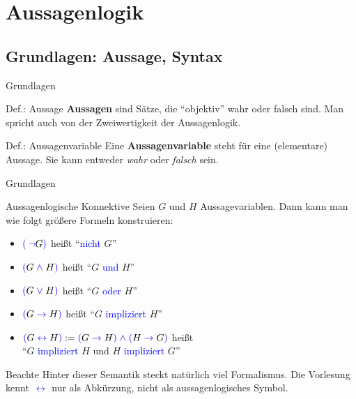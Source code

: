 \section{Aussagenlogik}
\subsection{Grundlagen: Aussage, Syntax}

\begin{frame}{Grundlagen}
	\begin{block}{Def.: Aussage}
		\textbf{Aussagen} sind Sätze, die "`objektiv"' wahr oder falsch sind. Man spricht auch von der Zweiwertigkeit der Aussagenlogik.
	\end{block}
	\pause
	\begin{block}{Def.: Aussagenvariable}
		Eine \textbf{Aussagenvariable} steht für eine (elementare) Aussage. Sie kann entweder \emph{wahr} oder \emph{falsch} sein.
	\end{block}
\end{frame}

\begin{frame}{Grundlagen}
	\begin{block}{Aussagenlogische Konnektive}
		Seien \(G\) und \(H\) Aussagevariablen. Dann kann man wie folgt größere Formeln konstruieren:
		\pause
		\begin{itemize}[<+->]
			\item \(	\textcolor{blue}{(}\text{} 	\text{\;}\textcolor{blue}{\neg}\text{}  G \textcolor{blue}{)}\text{} 	\) heißt \enquote{\textcolor{blue}{nicht} \(G\)}
			\item \(	\textcolor{blue}{(}\text{} 	G \text{\;}\textcolor{blue}{\wedge}\text{\;}  H		\textcolor{blue}{)}\text{} 	\)	heißt \enquote{\(G\) \textcolor{blue}{und} \(H\)}
			\item \(	\textcolor{blue}{(}\text{} 	G \text{\;}\textcolor{blue}{\vee}\text{\;} H		\textcolor{blue}{)}\text{} 	\)	heißt \enquote{\(G\) \textcolor{blue}{oder} \(H\)}
			\item \(	\textcolor{blue}{(}\text{} 	G  \text{\;}\textcolor{blue}{\to}\text{\;} H		\textcolor{blue}{)}\text{} 	\)	heißt \enquote{\(G\) \textcolor{blue}{impliziert} \(H\)}
			\item \(	\textcolor{blue}{(}\text{} 	G  \text{\;}\textcolor{blue}{\leftrightarrow}\text{\;} H		\textcolor{blue}{)}\text{} := \textcolor{blue}{(}\text{}	G  \text{\;}\textcolor{blue}{\to}\text{\;} H		\textcolor{blue}{)}\text{}  \text{\;}\textcolor{blue}{\wedge}\text{\;}  \textcolor{blue}{(}\text{} 	H  \text{\;}\textcolor{blue}{\to}\text{\;} G		\textcolor{blue}{)}\text{}	\)	heißt \\ \enquote{\(G\) \textcolor{blue}{impliziert} \(H\) und \(H\) \textcolor{blue}{impliziert} \(G\)}
		\end{itemize}
	\end{block}
	\pause
	\begin{alertblock}{Beachte}
		Hinter dieser Semantik steckt natürlich viel Formalismus. Die Vorlesung kennt \(\text{\;}\textcolor{blue}{\leftrightarrow}\text{\;}\) nur als Abkürzung, nicht als aussagenlogisches Symbol.
	\end{alertblock}
\end{frame}

